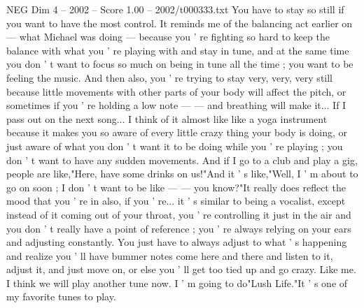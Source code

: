 \begin{textsample}{NEG Dim 4 – 2002 – Score 1.00 – 2002/t000333.txt}
You have to stay so still if you want to have the most control.
It reminds me of the balancing act earlier on — what Michael was doing — because you ' re fighting so hard to keep the balance with what you ' re playing with and stay in tune, and at the same time you don ' t want to focus so much on being in tune all the time ; you want to be feeling the music.
And then also, you ' re trying to stay very, very, very still because little movements with other parts of your body will affect the pitch, or sometimes if you ' re holding a low note — — and breathing will make it...
If I pass out on the next song...
I think of it almost like like a yoga instrument because it makes you so aware of every little crazy thing your body is doing, or just aware of what you don ' t want it to be doing while you ' re playing ; you don ' t want to have any sudden movements.
And if I go to a club and play a gig, people are like,"Here, have some drinks on us!"And it ' s like,"Well, I ' m about to go on soon ; I don ' t want to be like — — you know?"It really does reflect the mood that you ' re in also, if you ' re... it ' s similar to being a vocalist, except instead of it coming out of your throat, you ' re controlling it just in the air and you don ' t really have a point of reference ; you ' re always relying on your ears and adjusting constantly.
You just have to always adjust to what ' s happening and realize you ' ll have bummer notes come here and there and listen to it, adjust it, and just move on, or else you ' ll get too tied up and go crazy.
Like me.
I think we will play another tune now.
I ' m going to do"Lush Life."It ' s one of my favorite tunes to play.

\end{textsample}
